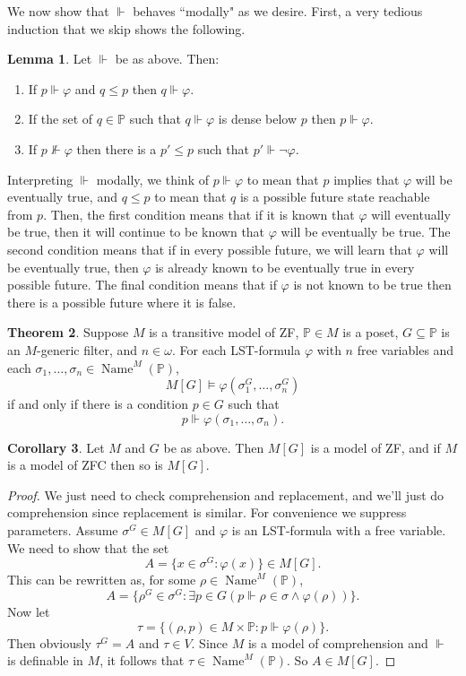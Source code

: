 \documentclass[12pt]{report}
\newcommand{\PP}{\mathbb{P}}
\DeclareMathOperator{\Name}{Name}
\theoremstyle{definition}
\newtheorem{theorem}{Theorem}[chapter]
\newtheorem{lemma}[theorem]{Lemma}
\newtheorem{corollary}[theorem]{Corollary}
\begin{document}
We now show that $\Vdash$ behaves ``modally" as we desire. First, a very tedious induction that we skip shows the following.
\begin{lemma}
    Let $\Vdash$ be as above. Then:
\begin{enumerate}
    \item If $p \Vdash \varphi$ and $q \leq p$ then $q \Vdash \varphi$.
    \item If the set of $q \in \PP$ such that $q \Vdash \varphi$ is dense below $p$ then $p \Vdash \varphi$.
    \item If $p \not \Vdash \varphi$ then there is a $p' \leq p$ such that $p' \Vdash \neg \varphi$.
\end{enumerate}
\end{lemma}
    Interpreting $\Vdash$ modally, we think of $p \Vdash \varphi$ to mean that $p$ implies that $\varphi$ will be eventually true, and $q \leq p$ to mean that $q$ is a possible future state reachable from $p$. Then, the first condition means that if it is known that $\varphi$ will eventually be true, then it will continue to be known that $\varphi$ will be eventually be true. The second condition means that if in every possible future, we will learn that $\varphi$ will be eventually true, then $\varphi$ is already known to be eventually true in every possible future. The final condition means that if $\varphi$ is not known to be true then there is a possible future where it is false.

\begin{theorem}
    Suppose $M$ is a transitive model of ZF, $\PP \in M$ is a poset, $G \subseteq \PP$ is an $M$-generic filter, and $n \in \omega$. For each LST-formula $\varphi$ with $n$ free variables and each $\sigma_1, \dots, \sigma_n \in \Name^M(\PP)$,
    $$M[G] \models \varphi(\sigma_1^G, \dots, \sigma_n^G)$$
    if and only if there is a condition $p \in G$ such that
    $$p \Vdash \varphi(\sigma_1, \dots, \sigma_n).$$
\end{theorem}
\begin{corollary}
    Let $M$ and $G$ be as above. Then $M[G]$ is a model of ZF, and if $M$ is a model of ZFC then so is $M[G]$.
\end{corollary}
\begin{proof}
    We just need to check comprehension and replacement, and we'll just do comprehension since replacement is similar. For convenience we suppress parameters. Assume $\sigma^G \in M[G]$ and $\varphi$ is an LST-formula with a free variable. We need to show that the set
    $$A = \{x \in \sigma^G: \varphi(x)\} \in M[G].$$
    This can be rewritten as, for some $\rho \in \Name^M(\PP)$,
    $$A = \{\rho^G \in \sigma^G: \exists p \in G(p \Vdash \rho \in \sigma \wedge \varphi(\rho))\}.$$
    Now let
    $$\tau = \{(\rho, p) \in M \times \PP: p \Vdash \varphi(\rho)\}.$$
    Then obviously $\tau^G = A$ and $\tau \in V$. Since $M$ is a model of comprehension and $\Vdash$ is definable in $M$, it follows that $\tau \in \Name^M(\PP)$. So $A \in M[G]$.
\end{proof}
\end{document}
